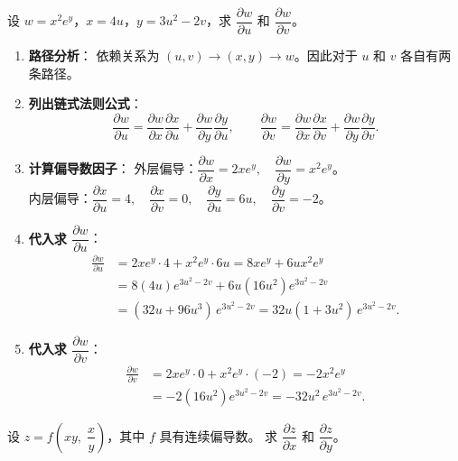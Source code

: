\documentclass[lang=cn,11pt]{elegantbook}
\begin{document}
\begin{exercise} \label{ex:chain-2var}
设 $w=x^2e^y$，$x=4u$，$y=3u^2-2v$，求 $\dfrac{\partial w}{\partial u}$ 和 $\dfrac{\partial w}{\partial v}$。
\end{exercise}

\begin{solution}
\begin{enumerate}
  \item \textbf{路径分析}：
  依赖关系为 $(u,v)\to(x,y)\to w$。因此对于 $u$ 和 $v$ 各自有两条路径。

  \item \textbf{列出链式法则公式}：
  \[
  \frac{\partial w}{\partial u}
  =\frac{\partial w}{\partial x}\frac{\partial x}{\partial u}
  +\frac{\partial w}{\partial y}\frac{\partial y}{\partial u},
  \qquad
  \frac{\partial w}{\partial v}
  =\frac{\partial w}{\partial x}\frac{\partial x}{\partial v}
  +\frac{\partial w}{\partial y}\frac{\partial y}{\partial v}.
  \]

  \item \textbf{计算偏导数因子}：
  外层偏导：$\dfrac{\partial w}{\partial x}=2xe^y,\quad \dfrac{\partial w}{\partial y}=x^2e^y$。\\
  内层偏导：$\dfrac{\partial x}{\partial u}=4,\quad \dfrac{\partial x}{\partial v}=0,\quad \dfrac{\partial y}{\partial u}=6u,\quad \dfrac{\partial y}{\partial v}=-2$。

  \item \textbf{代入求 $\dfrac{\partial w}{\partial u}$}：
  \begin{align*}
  \frac{\partial w}{\partial u}
  &=2xe^y\cdot 4+x^2e^y\cdot 6u
   =8xe^y+6ux^2e^y \\
  &=8(4u) e^{3u^2-2v}+6u(16u^2) e^{3u^2-2v}\\
  &=(32u+96u^3)\,e^{3u^2-2v}
   =\boxed{32u(1+3u^2)\,e^{3u^2-2v}}.
  \end{align*}

  \item \textbf{代入求 $\dfrac{\partial w}{\partial v}$}：
  \begin{align*}
  \frac{\partial w}{\partial v}
  &=2xe^y\cdot 0+x^2e^y\cdot(-2)
  =-2x^2e^y \\
  &=-2(16u^2) e^{3u^2-2v}
  =\boxed{-32u^2\,e^{3u^2-2v}}.
  \end{align*}
\end{enumerate}
\end{solution}

\begin{exercise}[抽象复合函数的偏导数] \label{ex:chain-abstract}
设 $z=f\!\left(xy,\;\dfrac{x}{y}\right)$，其中 $f$ 具有连续偏导数。
求 $\dfrac{\partial z}{\partial x}$ 和 $\dfrac{\partial z}{\partial y}$。
\end{exercise}
\end{document}
